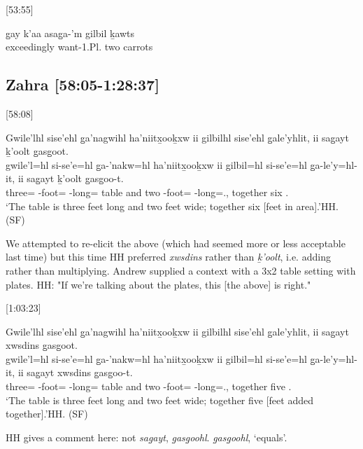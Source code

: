 [53:55]
\begin{exe}
\ex \gll g̱ay k'aa asag̱a-'m gilbil ḵawts \\
\Cntr{} exceedingly want-1.Pl.\Ii{} two carrots \\
\end{exe}

\subsection{Zahra [58:05-1:28:37]}

[58:08]

\begin{exe}
    \ex \glll Gwile'lhl sise’ehl g̱a’nagwihl ha’niitx̱ooḵxw ii gilbilhl sise’ehl g̱ale’yhlit, ii sag̱ayt ḵ’oolt g̱asg̱oot. \\
    gwile'l=hl si-se’e=hl g̱a-’nakw=hl ha’niitx̱ooḵxw ii gilbil=hl si-se’e=hl   g̱a-le’y=hl-it, ii sag̱ayt ḵ’oolt g̱asg̱oo-t. \\
    three=\Cn{} \Pl-foot=\Cn{} \Distr-long=\Cn{} table and two \Pl-foot=\Cn{} \Distr-long=.\Ii, \Ccnj{} together six .\Ii \\ 
    \glt `The table is three feet long and two feet wide; together six [feet in area].'\hfill HH.\ElicitationDate{} (SF)
\end{exe}

We attempted to re-elicit the above (which had seemed more or less acceptable last time) but this time HH preferred \textit{xwsdins} rather than \textit{ḵ'oolt}, i.e. adding rather than multiplying. Andrew supplied a context with a 3x2 table setting with plates. HH: "If we're talking about the plates, this [the above] is right."

[1:03:23]
\begin{exe}
    \ex \glll Gwile'lhl sise’ehl g̱a’nagwihl ha’niitx̱ooḵxw ii gilbilhl sise’ehl g̱ale’yhlit, ii sag̱ayt xwsdins g̱asg̱oot. \\
    gwile'l=hl si-se’e=hl g̱a-’nakw=hl ha’niitx̱ooḵxw ii gilbil=hl si-se’e=hl   g̱a-le’y=hl-it, ii sag̱ayt xwsdins g̱asg̱oo-t. \\
    three=\Cn{} \Pl-foot=\Cn{} \Distr-long=\Cn{} table and two \Pl-foot=\Cn{} \Distr-long=.\Ii, \Ccnj{} together five .\Ii \\ 
    \glt `The table is three feet long and two feet wide; together five [feet added together].'\hfill HH.\ElicitationDate{} (SF)
\end{exe}

HH gives a comment here: not \textit{sag̱ayt}, \textit{g̱asg̱oohl}. \textit{g̱asg̱oohl}, `equals'.

